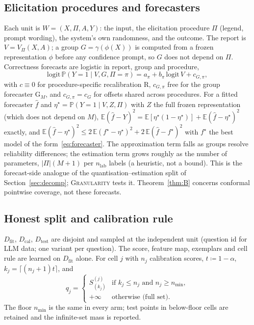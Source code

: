 \documentclass[11pt]{article}
\theoremstyle{definition}
\theoremstyle{remark}
\newcommand{\Dfit}{D_{\mathrm{fit}}}
\newcommand{\Dcal}{D_{\mathrm{cal}}}
\newcommand{\Dtest}{D_{\mathrm{test}}}
\newcommand{\E}{\mathbb{E}}
\renewcommand{\P}{\mathbb{P}}
\newcommand{\1}{\mathbf{1}}
\newcommand{\expname}[1]{\textsc{#1}}
\begin{document}
\subsection{Elicitation procedures and forecasters}
\label{sec:forecasters}
Each unit is $W=(X,\Pi,A,Y)$: the input, the elicitation procedure $\Pi$ (legend, prompt wording), the
system's own randomness, and the outcome. The report is $V=V_\Pi(X,A)$; a group $G=\gamma(\phi(X))$ is
computed from a frozen representation $\phi$ before any confidence prompt, so $G$ does not depend on
$\Pi$. Correctness forecasts are logistic in report, group and procedure,
\begin{equation}
  \mathrm{logit}\,\P(Y=1\mid V,G,\Pi=\pi) = a_\pi + b_\pi\,\mathrm{logit}\,V + c_{G,\pi},
  \label{eq:forecaster}
\end{equation}
with $c\equiv0$ for procedure-specific recalibration R, $c_{G,\pi}$ free for the group forecaster
G$_M$, and $c_{G,\pi}=c_G$ for offsets shared across procedures. For a fitted forecaster $\hat f$ and
$\eta^\star=\P(Y=1\mid V,Z,\Pi)$ with $Z$ the full frozen representation (which does not depend on $M$),
$\E(\hat f-Y)^2=\E[\eta^\star(1-\eta^\star)]+\E(\hat f-\eta^\star)^2$ exactly, and
$\E(\hat f-\eta^\star)^2\le2\,\E(f^\star-\eta^\star)^2+2\,\E(\hat f-f^\star)^2$ with $f^\star$ the best model of
the form~\eqref{eq:forecaster}. The approximation term falls as groups resolve reliability
differences; the estimation term grows roughly as the number of parameters, $|\Pi|(M+1)$ per
$n_{\mathrm{lab}}$ labels (a heuristic, not a bound). This
is the forecast-side analogue of the quantisation--estimation split of
Section~\ref{sec:decomp}; \expname{Granularity} tests it. Theorem~\ref{thm:B} concerns conformal pointwise coverage,
not these forecasts.

\subsection{Honest split and calibration rule}
$\Dfit$, $\Dcal$, $\Dtest$ are disjoint and sampled at the independent unit
(question id for LLM data; one variant per question). The score, feature map,
exemplars and cell rule are learned on $\Dfit$ alone. For cell $j$ with $n_j$
calibration scores, $t \coloneqq 1-\alpha$,
$k_j = \lceil (n_j+1)t \rceil$, and
\[
  q_j =
  \begin{cases}
    S_{(k_j)}^{(j)} & \text{if } k_j \le n_j \text{ and } n_j \ge n_{\min},\\
    +\infty & \text{otherwise (full set)}.
  \end{cases}
\]
The floor $n_{\min}$ is the same in every arm; test points in below-floor cells
are retained and the infinite-set mass is reported.
\end{document}
